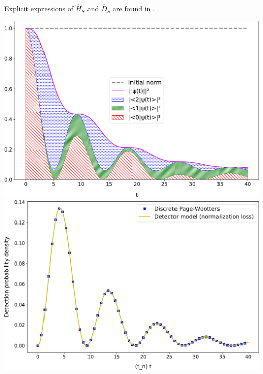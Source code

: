\documentclass[a0,portrait]{a0poster}
\renewcommand{\op}{\hat}                  %
\begin{document}
\begin{multicols}{2}
Explicit expressions of $\op{H}_S$ and $\op{D}_S$ are found in \cite[s.~4.7]{DeRosaMSc}.

\vspace{8cm}

\begin{center}
  \includegraphics[width=.23\textwidth]{3ldetect/loss3color.pdf}
  \hspace{0.4cm}
  \includegraphics[width=.23\textwidth]{3ldetect/conditionalProbFit.pdf}
\end{center}


\color{SaddleBrown} %





\end{multicols}
\end{document}
